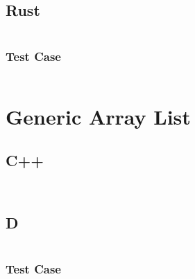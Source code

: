 \documentclass[finalcopy]{srpaper}
\begin{document}
\subsection{Rust}
\begin{mdframed}[linecolor=black]
\inputminted[fontsize=\scriptsize]{rust}{../examples/int-linked-list/int_linked_list.rs}
\end{mdframed}

\subsubsection{Test Case}
\begin{mdframed}[linecolor=black]
\inputminted[fontsize=\scriptsize]{rust}{../examples/int-linked-list/tests/int-linked-list-test.rs}
\end{mdframed}

\section{Generic Array List}
\subsection{C++}
\begin{mdframed}[linecolor=black]
\inputminted[fontsize=\scriptsize]{cpp}{../examples/generic-array-list/generic_array_list.hpp}
\end{mdframed}

\begin{mdframed}[linecolor=black]
\inputminted[fontsize=\scriptsize]{cpp}{../examples/generic-array-list/generic_array_list.cpp}
\end{mdframed}

\subsection{D}
\begin{mdframed}[linecolor=black]
\inputminted[fontsize=\scriptsize]{d}{../examples/generic-array-list/generic_array_list.d}
\end{mdframed}

\subsubsection{Test Case}
\begin{mdframed}[linecolor=black]
\inputminted[fontsize=\scriptsize]{d}{../examples/generic-array-list/tests/generic_array_list_test.d}
\end{mdframed}
\end{document}
